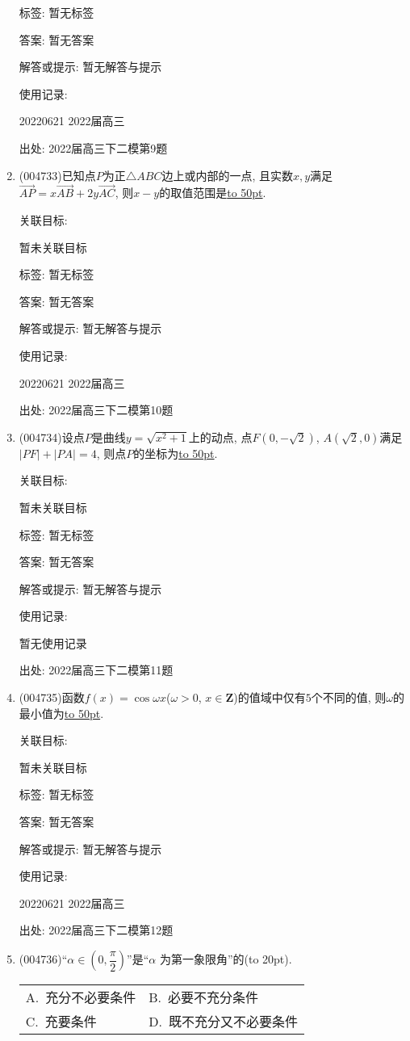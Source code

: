 \documentclass[10pt,a4paper]{article}
\newcommand{\blank}[1]{\underline{\hbox to #1pt{}}}
\newcommand{\bracket}[1]{(\hbox to #1pt{})}
\newcommand{\twoch}[4]{\par\begin{tabular}{p{.46\textwidth}p{.46\textwidth}}
A.~#1& B.~#2\\
C.~#3& D.~#4
\end{tabular}}
\begin{document}
\begin{enumerate}[1.]
标签: 暂无标签

答案: 暂无答案

解答或提示: 暂无解答与提示

使用记录:

20220621	2022届高三	


出处: 2022届高三下二模第9题
\item { (004733)}已知点$P$为正$\triangle ABC$边上或内部的一点, 且实数$x,y$满足$\overrightarrow{AP}=x\overrightarrow{AB}+2y\overrightarrow{AC}$, 则$x-y$的取值范围是\blank{50}.


关联目标:

暂未关联目标



标签: 暂无标签

答案: 暂无答案

解答或提示: 暂无解答与提示

使用记录:

20220621	2022届高三	


出处: 2022届高三下二模第10题
\item { (004734)}设点$P$是曲线$y=\sqrt{x^2+1}$上的动点, 点$F(0,-\sqrt 2)$, $A(\sqrt 2,0)$满足$|PF|+|PA|=4$, 则点$P$的坐标为\blank{50}.


关联目标:

暂未关联目标



标签: 暂无标签

答案: 暂无答案

解答或提示: 暂无解答与提示

使用记录:

暂无使用记录


出处: 2022届高三下二模第11题
\item { (004735)}函数$f(x)=\cos \omega x$($\omega >0$, $x\in \mathbf{Z}$)的值域中仅有$5$个不同的值, 则$\omega$的最小值为\blank{50}.


关联目标:

暂未关联目标



标签: 暂无标签

答案: 暂无答案

解答或提示: 暂无解答与提示

使用记录:

20220621	2022届高三	


出处: 2022届高三下二模第12题
\item { (004736)}``$\alpha \in (0,\dfrac{\pi}2)$''是``$\alpha$ 为第一象限角''的\bracket{20}.
\twoch{充分不必要条件}{必要不充分条件}{充要条件}{既不充分又不必要条件}



\end{enumerate}
\end{document}
